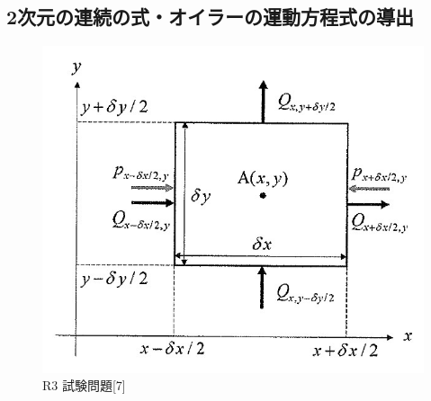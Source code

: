 \documentclass[a4paper]{jsarticle}
\begin{document}
\subsection{2次元の連続の式・オイラーの運動方程式の導出}
\begin{figure}[htbp]
    \begin{center}
        \includegraphics[width=120mm]{images/ryuriki_image1.jpg}
        \caption{R3 試験問題[7]}
    \end{center}
\end{figure}
\end{document}
